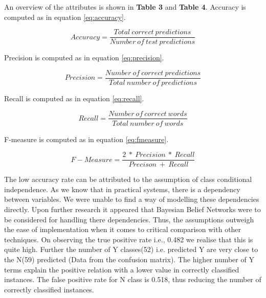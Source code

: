 \begin{table}[t]
\centering

\aftertabspace
\end{table}

\begin{table}[t]
\centering

\aftertabspace
\end{table}
  


An overview of the attributes is shown in \textbf {Table 3} and \textbf{Table 4}.
Accuracy is computed as in equation  \eqref{eq:accuracy}.

\begin{equation}
\label{eq:accuracy}
Accuracy = \frac{\mathit{Total\ correct\ predictions}}{\mathit{Number\ of\ test\ predictions}}
\end{equation}


Precision is computed as in equation \eqref{eq:precision}.

\begin{equation}
\label{eq:precision}
Precision = \frac{\mathit{Number\ of\ correct\ predictions}}{\mathit{Total\ number\ of\ predictions}}
\end{equation}

Recall is computed as in equation \eqref{eq:recall}.

\begin{equation}
\label{eq:recall}
Recall = \frac{\mathit{Number\ of\ correct\ words}}{\mathit{Total\ number\ of\ words}}
\end{equation}

F-measure is computed as in equation  \eqref{eq:fmeasure}.

\begin{equation}
\label{eq:fmeasure}
F-Measure = \frac{\mathit{2\ *\ Precision\ *\ Recall}}{\mathit{Precison\ +\ Recall}}
\end{equation}

 The low accuracy rate can be attributed to the assumption of class conditional independence. As we know that in practical systems, there is a dependency between variables. We were unable to find a way of modelling these dependencies directly. Upon further research it appeared that Bayesian Belief Networks were to be considered for handling there dependencies. Thus, the assumptions outweigh the ease of implementation when it comes to critical comparison with other techniques.
On observing the true positive rate i.e., 0.482 we realise that this is quite high. Further the number of Y classes(52) i.e. predicted Y are very close to the N(59) predicted (Data from the confusion matrix). The higher number of Y terms explain the positive relation with a lower value in correctly classified instances. The false positive rate for N class is 0.518, thus reducing the number of correctly classified instances. 

